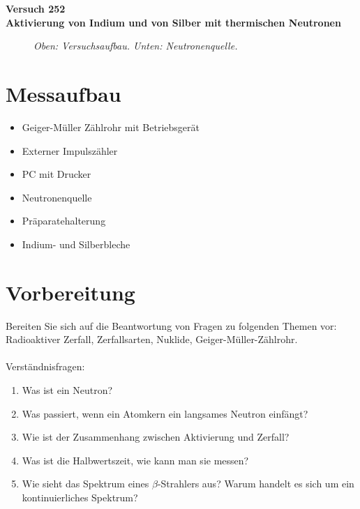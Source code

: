\documentclass[landscape,twocolumn]{article}
\begin{document}
\pagestyle{fancyplain}
  

\cfoot{\large\vspace{0.1in}$\qquad$\rm\thepage}
 \setlength{\footrulewidth}{0.4pt}
\renewcommand{\thesection}{\Roman{section}}


\begin{center}
\LARGE\bf{Versuch 252\\ Aktivierung von Indium und von Silber mit thermischen Neutronen}
\end{center}

\begin{figure}[h]
\begin{minipage}[c]{12cm}
\centering{}
\caption{\fontsize{10}{12}\it Oben: Versuchsaufbau. Unten: Neutronenquelle.}
\end{minipage}
\end{figure}


\section{Messaufbau}
\begin{itemize}
 \item  Geiger-M\"{u}ller Z\"{a}hlrohr mit Betriebsger\"{a}t
 \item  Externer Impulsz\"{a}hler
 \item PC mit Drucker
 \item Neutronenquelle
 \item Pr\"{a}paratehalterung
 \item Indium- und Silberbleche
\end{itemize}



\section{Vorbereitung}
Bereiten Sie sich  auf die Beantwortung von Fragen zu folgenden
Themen vor: Radioaktiver Zerfall, Zerfallsarten, Nuklide,
Geiger-M\"{u}ller-Z\"{a}hlrohr.\\
\\Verst\"{a}ndnisfragen:
\begin{enumerate}
\item Was ist ein Neutron?
\item Was passiert, wenn ein Atomkern ein langsames Neutron einf\"{a}ngt?
\item Wie ist der Zusammenhang zwischen Aktivierung und Zerfall?
\item Was ist die Halbwertszeit, wie kann man sie messen?
\item Wie sieht das Spektrum eines $\beta$-Strahlers aus? Warum handelt es sich um ein
kontinuierliches Spektrum?
\end{enumerate}
\end{document}
